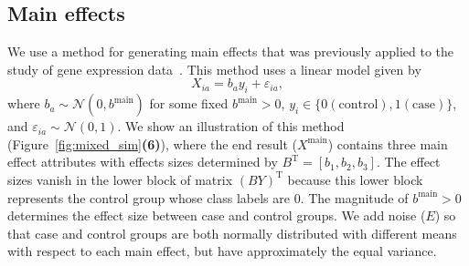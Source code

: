 \documentclass[10pt,letterpaper]{article}
\begin{document}


\subsection{Main effects}
We use a method for generating main effects that was previously applied to the study of gene expression data~\cite{leek2007}. This method uses a linear model given by
%
\begin{equation}\label{eq:lin-mod}
X_{ia} = b_a y_i + \varepsilon_{ia},
\end{equation}
%
where $b_a \sim \mathcal{N}(0,b^\text{main})$ for some fixed $b^\text{main}>0$, $y_i \in \{0 (\text{control}),1 (\text{case})\}$, and $\varepsilon_{ia} \sim \mathcal{N}(0,1)$. We show an illustration of this method (Figure~\ref{fig:mixed_sim}\textbf{(6)}), where the end result ($X^\text{main}$) contains three main effect attributes with effects sizes determined by $B^\text{T}=[b_1,b_2,b_3]$. The effect sizes vanish in the lower block of matrix $(BY)^\text{T}$ because this lower block represents the control group whose class labels are 0. The magnitude of $b^\text{main}>0$ determines the effect size between case and control groups. We add noise ($E$) so that case and control groups are both normally distributed with different means with respect to each main effect, but have approximately the equal variance.
\end{document}
